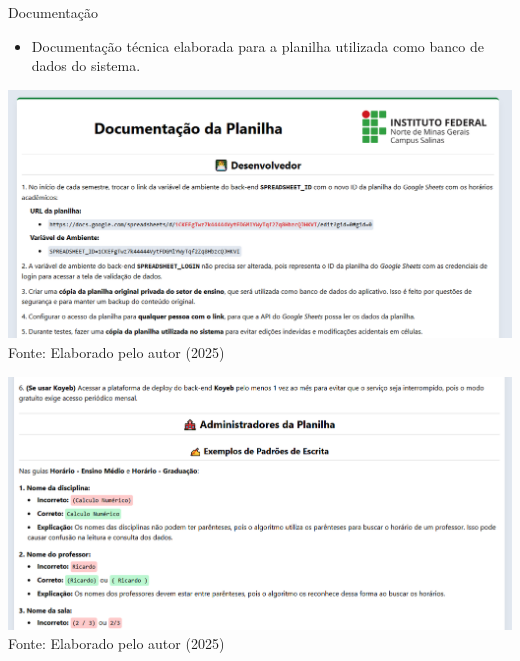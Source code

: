 \begin{frame}{Documentação}
    \begin{itemize}
        \item Documentação técnica elaborada para a planilha utilizada como banco de dados do sistema.
    \end{itemize}
    \begin{minipage}{0.48\textwidth}
        \centering
        \includegraphics[width=1\textwidth]{figuras/doc-1.png}
        \footnotesize Fonte: Elaborado pelo autor (2025)
    \end{minipage}
    \hfill
    \begin{minipage}{0.48\textwidth}
        \centering
        \includegraphics[width=1\textwidth]{figuras/doc-2.png}
        \footnotesize Fonte: Elaborado pelo autor (2025)
    \end{minipage}
\end{frame}

